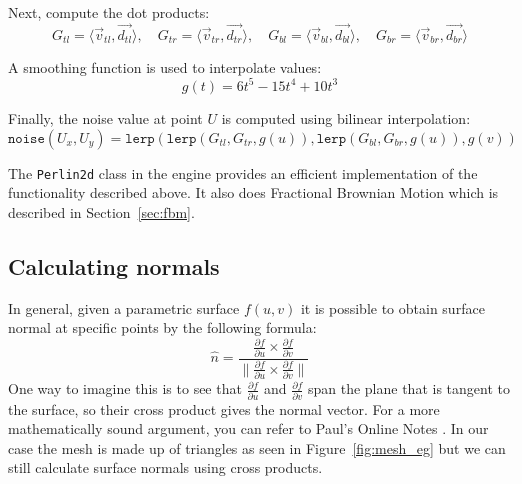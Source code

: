 Next, compute the dot products:
\[
G_{tl} = \langle \vec{v}_{tl}, \vec{d_{tl}} \rangle, \quad G_{tr} = \langle \vec{v}_{tr}, \vec{d_{tr}} \rangle, \quad G_{bl} = \langle \vec{v}_{bl}, \vec{d_{bl}} \rangle, \quad G_{br} = \langle \vec{v}_{br}, \vec{d_{br}} \rangle
\]

A smoothing function is used to interpolate values:
\[
g(t) = 6t^5 - 15t^4 + 10t^3
\]

Finally, the noise value at point $U$ is computed using bilinear interpolation:
\[
\texttt{noise}(U_x, U_y) = \texttt{lerp}(\texttt{lerp}(G_{tl}, G_{tr}, g(u)), \texttt{lerp}(G_{bl}, G_{br}, g(u)), g(v))
\]

The \texttt{Perlin2d} class in the engine provides an efficient implementation of the functionality described above. It also does Fractional Brownian Motion which is described in Section~\ref{sec:fbm}.

\subsection{Calculating normals}
In general, given a parametric surface $f(u, v)$ it is possible to obtain surface normal at specific points by the following formula: 
\[ \hat{n} = \frac{\frac{\partial{f}}{\partial{u}} \times \frac{\partial{f}}{\partial{v}}}
{\|\frac{\partial{f}}{\partial{u}} \times \frac{\partial{f}}{\partial{v}}\|}
\]
One way to imagine this is to see that $\frac{\partial{f}}{\partial{u}}$ and $\frac{\partial{f}}{\partial{v}}$ span the plane that is tangent to the surface, so their cross product gives the normal vector. For a more mathematically sound argument, you can refer to Paul's Online Notes \cite{dawkins_parametric_surfaces}.
In our case the mesh is made up of triangles as seen in Figure~\ref{fig:mesh_eg} but we can still calculate surface normals using cross products.

